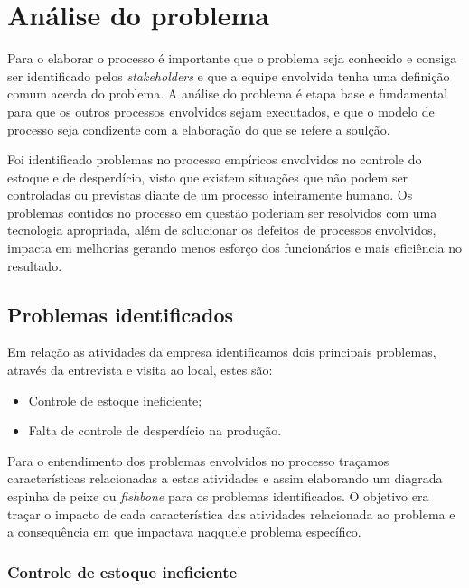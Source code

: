 \chapter{Análise do problema}

Para o elaborar o processo é importante que o problema seja conhecido e consiga ser identificado pelos {\itshape stakeholders} e que a equipe envolvida tenha uma definição comum acerda do problema. A análise do problema é etapa base e fundamental para que os outros processos envolvidos sejam executados, e que o modelo de processo seja condizente com a elaboração do que se refere a soulção.

Foi identificado problemas no processo empíricos envolvidos no controle do estoque e de desperdício, visto que existem situações que não podem ser controladas ou previstas diante de um processo inteiramente humano. Os problemas contidos no processo em questão poderiam ser resolvidos com uma tecnologia apropriada, além de solucionar os defeitos de processos envolvidos, impacta em melhorias gerando menos esforço dos funcionários e mais eficiência no resultado.

\section{Problemas identificados}

Em relação as atividades da empresa identificamos dois principais problemas, através da entrevista e visita ao local, estes são:

\begin{itemize}
	\item Controle de estoque ineficiente;
	\item Falta de controle de desperdício na produção.
\end{itemize}

Para o entendimento dos problemas envolvidos no processo traçamos características relacionadas a estas atividades e assim elaborando um diagrada espinha de peixe ou {\itshape fishbone} para os problemas identificados. O objetivo era traçar o impacto de cada característica das atividades relacionada ao problema e a consequência em que impactava naqquele problema específico.


\newpage

\subsection{Controle de estoque ineficiente}

